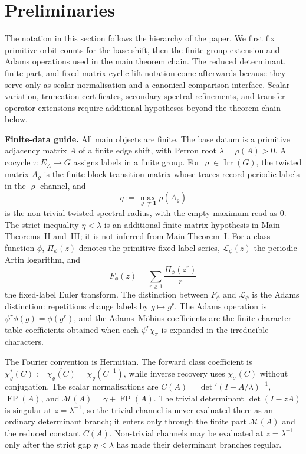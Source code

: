 \documentclass[11pt,a4paper]{amsart}
\theoremstyle{plain}
\theoremstyle{definition}
\theoremstyle{remark}
\DeclareMathOperator{\Irr}{Irr}
\DeclareMathOperator{\FP}{FP}
\begin{document}
\section{Preliminaries}\label{sec:preliminaries}

The notation in this section follows the hierarchy of the paper. We
first fix primitive orbit counts for the base shift, then the
finite-group extension and Adams operations used in the main theorem
chain. The reduced determinant, finite part, and fixed-matrix cyclic-lift
notation come afterwards because they serve only as scalar normalisation and a
canonical comparison interface.  Scalar variation, truncation certificates,
secondary spectral refinements, and transfer-operator extensions require
additional hypotheses beyond the theorem chain below.

\medskip
\noindent\textbf{Finite-data guide.}
All main objects are finite.  The base datum is a primitive adjacency
matrix \(A\) of a finite edge shift, with Perron root
\(\lambda=\rho(A)>0\).  A cocycle \(\tau:E_A\to G\) assigns labels in a
finite group.  For \(\varrho\in\Irr(G)\), the twisted matrix
\(A_\varrho\) is the finite block transition matrix whose traces record
periodic labels in the \(\varrho\)-channel, and
\[
  \eta:=\max_{\varrho\ne\mathbf1}\rho(A_\varrho)
\]
is the non-trivial twisted spectral radius, with the empty maximum read
as \(0\).  The strict inequality \(\eta<\lambda\) is an additional
finite-matrix hypothesis in Main Theorems~II and~III; it is not inferred
from Main Theorem~I.  For a class function \(\phi\),
\(\Pi_\phi(z)\) denotes the primitive fixed-label series,
\(\mathcal L_\phi(z)\) the periodic Artin logarithm, and
\[
  F_\phi(z)=\sum_{r\ge1}\frac{\Pi_\phi(z^r)}{r}
\]
the fixed-label Euler transform.  The distinction between
\(F_\phi\) and \(\mathcal L_\phi\) is the Adams distinction: repetitions
change labels by \(g\mapsto g^r\).  The Adams operation is
\(\psi^r\phi(g)=\phi(g^r)\), and the Adams--M\"obius coefficients are the
finite character-table coefficients obtained when each
\(\psi^r\chi_\pi\) is expanded in the irreducible characters.

The Fourier convention is Hermitian.  The forward class coefficient is
\(\chi_\varrho^\ast(C):=\overline{\chi_\varrho(C)}
=\chi_\varrho(C^{-1})\), while inverse recovery uses
\(\chi_\sigma(C)\) without conjugation.  The scalar normalisations are
\(C(A)=\det'(I-A/\lambda)^{-1}\),
\(\FP(A)\), and \(\mathcal M(A)=\gamma+\FP(A)\).  The trivial determinant
\(\det(I-zA)\) is singular at \(z=\lambda^{-1}\), so the trivial channel
is never evaluated there as an ordinary determinant branch; it enters
only through the finite part \(\mathcal M(A)\) and the reduced constant
\(C(A)\).  Non-trivial channels may be evaluated at
\(z=\lambda^{-1}\) only after the strict gap \(\eta<\lambda\) has made
their determinant branches regular.
\end{document}
